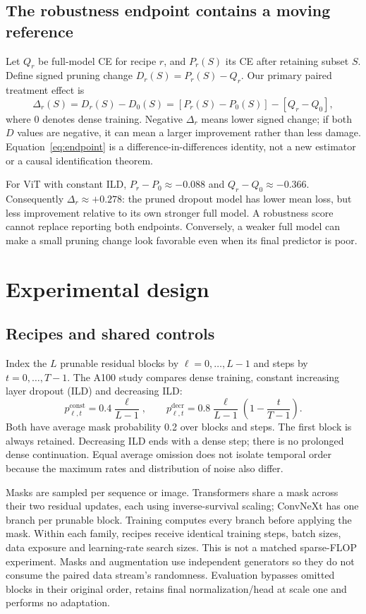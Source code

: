 \documentclass[10pt,letterpaper]{article}
\begin{document}
\subsection{The robustness endpoint contains a moving reference}
Let $Q_r$ be full-model CE for recipe $r$, and $P_r(S)$ its CE after retaining subset $S$. Define signed pruning change $D_r(S)=P_r(S)-Q_r$. Our primary paired treatment effect is
\begin{equation}
\Delta_r(S)=D_r(S)-D_0(S)
=[P_r(S)-P_0(S)]-[Q_r-Q_0],
\label{eq:endpoint}
\end{equation}
where $0$ denotes dense training. Negative $\Delta_r$ means lower signed change; if both $D$ values are negative, it can mean a larger improvement rather than less damage. Equation~\ref{eq:endpoint} is a difference-in-differences identity, not a new estimator or a causal identification theorem.

For ViT with constant ILD, $P_r-P_0\approx-0.088$ and $Q_r-Q_0\approx-0.366$. Consequently $\Delta_r\approx+0.278$: the pruned dropout model has lower mean loss, but less improvement relative to its own stronger full model. A robustness score cannot replace reporting both endpoints. Conversely, a weaker full model can make a small pruning change look favorable even when its final predictor is poor.

\clearpage
\section{Experimental design}
\subsection{Recipes and shared controls}
Index the $L$ prunable residual blocks by $\ell=0,\ldots,L-1$ and steps by $t=0,\ldots,T-1$. The A100 study compares dense training, constant increasing layer dropout (ILD) and decreasing ILD:
\begin{equation}
p_{\ell,t}^{\mathrm{const}}=0.4\frac{\ell}{L-1},\qquad
p_{\ell,t}^{\mathrm{decr}}=0.8\frac{\ell}{L-1}\left(1-\frac{t}{T-1}\right).
\label{eq:schedules}
\end{equation}
Both have average mask probability 0.2 over blocks and steps. The first block is always retained. Decreasing ILD ends with a dense step; there is no prolonged dense continuation. Equal average omission does not isolate temporal order because the maximum rates and distribution of noise also differ.

Masks are sampled per sequence or image. Transformers share a mask across their two residual updates, each using inverse-survival scaling; ConvNeXt has one branch per prunable block. Training computes every branch before applying the mask. Within each family, recipes receive identical training steps, batch sizes, data exposure and learning-rate search sizes. This is not a matched sparse-FLOP experiment. Masks and augmentation use independent generators so they do not consume the paired data stream's randomness. Evaluation bypasses omitted blocks in their original order, retains final normalization/head at scale one and performs no adaptation.
\end{document}
